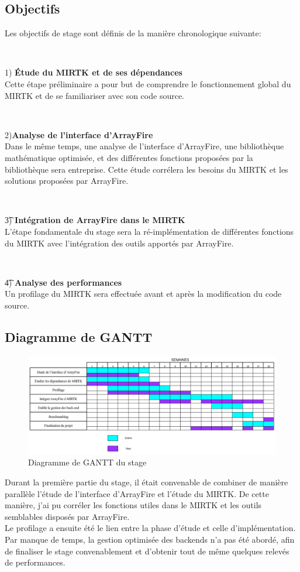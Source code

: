 \documentclass[10pt]{report}
\begin{document}
	\subsection{Objectifs} 
	Les objectifs de stage sont définis de la manière chronologique suivante:
	~\par~\par 
	1) \textbf{Étude du MIRTK et de ses dépendances} \\
	Cette étape préliminaire a pour but de comprendre le fonctionnement global du MIRTK et de se familiariser avec son code source. 
	~\par~\par 
	2)\textbf{Analyse de l'interface d'ArrayFire} \\
	Dans le même temps, une analyse de l'interface d'ArrayFire, une bibliothèque mathématique optimisée, et des différentes fonctions proposées par la bibliothèque sera entreprise. Cette étude corrélera les besoins du MIRTK et les solutions proposées par ArrayFire.
	~\par~\par 
	\t 3) \textbf{Intégration de ArrayFire dans le MIRTK} \\
	L'étape fondamentale du stage sera la ré-implémentation de différentes fonctions du MIRTK avec l'intégration des outils apportés par ArrayFire.
	~\par~\par 
	\t 4) \textbf{Analyse des performances} \\
	Un profilage du MIRTK sera effectuée avant et après la modification du code source.
\newpage
	\subsection{Diagramme de GANTT}
	\begin{figure}[h!]
		\begin{center}
			\includegraphics[width=18cm]{ganttchart.png}
		\end{center}	
		\caption{Diagramme de GANTT du stage}
		\label{Diagramme de GANTT du stage}
	\end{figure}
	Durant la première partie du stage, il était convenable de combiner de manière parallèle l'étude de l'interface d'ArrayFire et l'étude du MIRTK. De cette manière, j'ai pu corréler les fonctions utiles dans le MIRTK et les outils semblables disposés par ArrayFire.\\
	Le profilage a ensuite été le lien entre la phase d'étude et celle d'implémentation. \\
	Par manque de temps, la gestion optimisée des backends n'a pas été abordé, afin de finaliser le stage convenablement et d'obtenir tout de même quelques relevés de performances.
\end{document}
